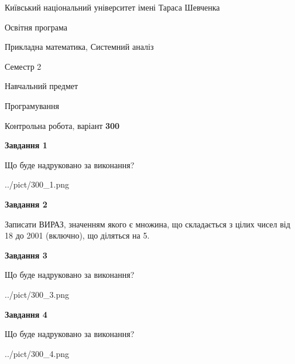 \documentclass[12pt, ukrainian]{article}
\begin{document}
{{\begin {small}\par
{ \center  Київський національний університет імені Тараса Шевченка \par}
{\parbox {5 cm}{Освітня програма \hfill}{\parbox {8 cm}{Прикладна математика, Системний аналіз \hfill}}\parbox {5 cm}{\hfill Семестр 2}}\par
{\parbox {5 cm} {Навчальний предмет \hfill}\parbox {7 cm}{Програмування \hfill}\parbox {6cm}{\hfill}\par}\vspace{-7pt} \end{small}}{\center Контрольна робота, варіант  \No \textbf
{ 300 }\par}}
{
\begin {large}
{\begin {center}\textbf{Завдання 1}\end {center}}\par
Що буде надруковано за виконання?\par\par
\begin{center}
	{../pict/300_1.png}
\end{center}
\newpage

{\begin {center}\textbf{Завдання 2}\end {center}}\par
Записати ВИРАЗ, значенням якого є множина, що складається з цілих чисел від 18 до 2001 (включно), що діляться на 5.\par
\newpage

{\begin {center}\textbf{Завдання 3}\end {center}}\par
Що буде надруковано за виконання?\par
\begin{center}
	{../pict/300_3.png}
\end{center}
\newpage

{\begin {center}\textbf{Завдання 4}\end {center}}\par
Що буде надруковано за виконання?\par
\begin{center}
	{../pict/300_4.png}
\end{center}
\newpage


\end{large}}
\end{document}
